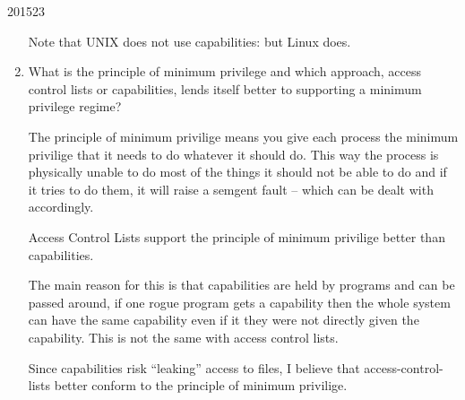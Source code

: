 \documentclass[10pt,\jkfside,a4paper]{article}
\begin{document}
\begin{examquestion}{2015}{2}{3}
\begin{enumerate}
Note that UNIX does not use capabilities: but Linux does.

\item What is the principle of minimum privilege and which approach, access control
lists or capabilities, lends itself better to supporting a minimum privilege regime?

The principle of minimum privilige means you give each process the minimum privilige 
that it needs to do whatever it should do. This way the process is physically unable to 
do most of the things it should not be able to do and if it tries to do them, it will 
raise a semgent fault -- which can be dealt with accordingly.

Access Control Lists support the principle of minimum privilige better than capabilities.

The main reason for this is that capabilities are held by programs and can be passed around, 
if one rogue program gets a capability then the whole system can have the same capability even 
if it they were not directly given the capability. This is not the same with access control lists. 

Since capabilities risk ``leaking'' access to files, I believe that access-control-lists better 
conform to the principle of minimum privilige.

\end{enumerate}

\end{examquestion}
\end{document}
